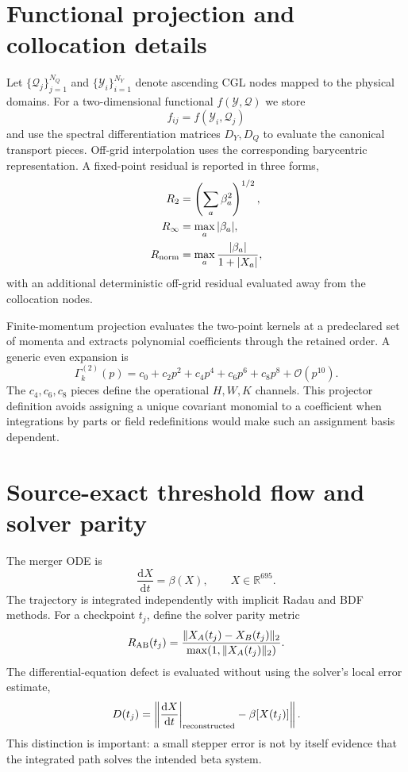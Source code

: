 \documentclass[12pt]{iopart}
\newcommand{\dd}{\mathrm{d}}
\newcommand{\cO}{\mathcal O}
\newcommand{\Q}{\mathcal Q}
\newcommand{\Y}{\mathcal Y}
\begin{document}
\section{Functional projection and collocation details}
\label{app:projection}

Let $\{\Q_j\}_{j=1}^{N_Q}$ and $\{\Y_i\}_{i=1}^{N_Y}$ denote ascending CGL nodes mapped to the physical domains.  For a two-dimensional functional $f(\Y,\Q)$ we store
\begin{equation}
f_{ij}=f(\Y_i,\Q_j)
\end{equation}
and use the spectral differentiation matrices $D_Y,D_Q$ to evaluate the canonical transport pieces.  Off-grid interpolation uses the corresponding barycentric representation.  A fixed-point residual is reported in three forms,
\begin{align}
R_2&=\left(\sum_a\beta_a^2\right)^{1/2},\\
R_\infty&=\max_a|\beta_a|,\\
R_{\rm norm}&=\max_a\frac{|\beta_a|}{1+|X_a|},
\end{align}
with an additional deterministic off-grid residual evaluated away from the collocation nodes.

Finite-momentum projection evaluates the two-point kernels at a predeclared set of momenta and extracts polynomial coefficients through the retained order.  A generic even expansion is
\begin{equation}
\Gamma_k^{(2)}(p)=c_0+c_2p^2+c_4p^4+c_6p^6+c_8p^8+\cO(p^{10}).
\end{equation}
The $c_4,c_6,c_8$ pieces define the operational $H,W,K$ channels.  This projector definition avoids assigning a unique covariant monomial to a coefficient when integrations by parts or field redefinitions would make such an assignment basis dependent.

\section{Source-exact threshold flow and solver parity}
\label{app:trajectory}

The merger ODE is
\begin{equation}
\frac{\dd X}{\dd t}=\beta(X),\qquad X\in\mathbb R^{695}.
\end{equation}
The trajectory is integrated independently with implicit Radau and BDF methods.  For a checkpoint $t_j$, define the solver parity metric
\begin{equation}
R_{\rm AB}(t_j)=\frac{\|X_A(t_j)-X_B(t_j)\|_2}{\max(1,\|X_A(t_j)\|_2)}.
\end{equation}
The differential-equation defect is evaluated without using the solver's local error estimate,
\begin{equation}
D(t_j)=\left\|\frac{\dd X}{\dd t}\bigg|_{\rm reconstructed}-\beta[X(t_j)]\right\|.
\end{equation}
This distinction is important: a small stepper error is not by itself evidence that the integrated path solves the intended beta system.
\end{document}
